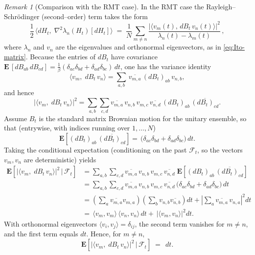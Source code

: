 \documentclass[12pt,reqno]{amsart}
\theoremstyle{plain}
\theoremstyle{definition}
\theoremstyle{remark}
\newtheorem{rem}{Remark}[section]       %
\begin{document}
\begin{rem}[Comparison with the RMT case] \label{rem:RMT2}
In the RMT case the
Rayleigh–Schr\"odinger (second–order) term takes the form
\begin{equation}
\frac{1}{2}\,\big\langle dH_t,\;\nabla^{2}\lambda_n(H_t)[dH_t]\big\rangle
 \;=\; \frac{1}{N}\sum_{m\neq n}
 \frac{\big|\langle v_m(t),\,dB_t\,v_n(t)\rangle\big|^{2}}
      {\lambda_n(t)-\lambda_m(t)}\,,
\end{equation}
where $\lambda_n$ and $v_n$ are the eigenvalues and orthonormal
eigenvectors, as in \eqref{eq:Ito-matrix}. Because the entries of $dB_t$ have covariance
\(
\mathbf E\,[dB_{ab}\,dB_{cd}]=\tfrac{1}{\beta}
(\delta_{ac}\delta_{bd}+\delta_{ad}\delta_{bc})\,dt
\),
one has the variance identity
\begin{equation}
\Big\langle v_m,\; dB_t\, v_n\Big\rangle
  = \sum_{a,b}\,\overline{v_{m,a}}\,(dB_t)_{ab}\,v_{n,b},
  \end{equation}
  and hence
  \begin{equation}
\Big|\big\langle v_m,\; dB_t\, v_n\big\rangle\Big|^{2}
  = \sum_{a,b}\sum_{c,d}
     \overline{v_{m,a}}\,v_{n,b}\,v_{m,c}\,\overline{v_{n,d}}\,
     (dB_t)_{ab}\,\overline{(dB_t)_{cd}}.
\end{equation}
Assume $B_t$ is the standard matrix Brownian motion for the unitary ensemble,
so that (entrywise, with indices running over $1,\dots,N$)
\begin{equation}
\mathbf E\!\left[(dB_t)_{ab}\,\overline{(dB_t)_{cd}}\right]
   = \,\big(\delta_{ac}\delta_{bd}
      + \delta_{ad}\delta_{bc}\big)\,dt .
\end{equation}
Taking the conditional expectation (conditioning on the past $\mathcal F_t$,
so the vectors $v_m,v_n$ are deterministic) yields
\begin{align}
\mathbf E\!\left[\Big|\big\langle v_m,\; dB_t\, v_n\big\rangle\Big|^{2}\,\Big|\,\mathcal F_t\right]
 &= \sum_{a,b}\sum_{c,d}
     \overline{v_{m,a}}\,v_{n,b}\,v_{m,c}\,\overline{v_{n,d}}\;
     \mathbf E\!\left[(dB_t)_{ab}\,\overline{(dB_t)_{cd}}\right] \nonumber\\
 &=\sum_{a,b}\sum_{c,d}
     \overline{v_{m,a}}\,v_{n,b}\,v_{m,c}\,\overline{v_{n,d}}\,
     \big(\delta_{ac}\delta_{bd}+\delta_{ad}\delta_{bc}\big)\,dt \nonumber\\
 &= \left(
     \sum_{a}\overline{v_{m,a}}v_{m,a}\right)
     \left(\sum_{b}v_{n,b}\overline{v_{n,b}}\right)dt
   + \left|\sum_{a}\overline{v_{m,a}}\,v_{n,a}\right|^{2}dt \nonumber\\
 &= \,\langle v_m,v_m\rangle\,\langle v_n,v_n\rangle\,dt
    + \,|\langle v_m,v_n\rangle|^{2}dt .
\end{align}
With orthonormal eigenvectors $\langle v_i,v_j\rangle=\delta_{ij}$, the
second term vanishes for $m\neq n$, and the first term equals $dt$.
Hence, for $m\neq n$,
\begin{equation}
\mathbf E\!\left[\Big|\big\langle v_m,\; dB_t\, v_n\big\rangle\Big|^{2}\,\Big|\,\mathcal F_t\right]
 \;=\; \,dt .
\end{equation}


\end{rem}
\end{document}
